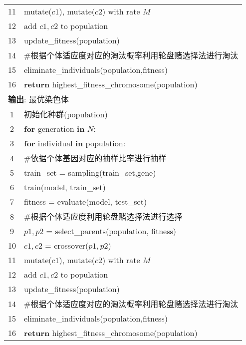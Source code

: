 \begin{table}[h]
\begin{tabularx}{1.0\textwidth}{cl}
		11 & \quad mutate($c1$), mutate($c2$) with rate $M$                                 \\
		12 & \quad add $c1, c2$ to population                                               \\
		13 & \quad update\_fitness(population)                                              \\
		14 & \quad \#根据个体适应度对应的淘汰概率利用轮盘赌选择法进行淘汰                   \\
		15 & \quad eliminate\_individuals(population,fitness)                               \\
		16 & \textbf{return} highest\_fitness\_chromosome(population)                       \\
		\multicolumn{2}{l}{\textbf{输出}: 最优染色体}                                       \\
		1  & 初始化种群(population)                                                         \\
		2  & \textbf{for} generation \textbf{in} $N$:                                       \\
		3  & \quad \textbf{for} individual \textbf{in} population:                          \\
		4  & \quad\quad \#依据个体基因对应的抽样比率进行抽样                                \\
		5  & \quad\quad train\_set = sampling(train\_set,gene)                              \\
		6  & \quad\quad train(model, train\_set)                                            \\
		7  & \quad\quad fitness = evaluate(model, test\_set)                                \\
		8  & \quad \#根据个体适应度利用轮盘赌选择法进行选择                                 \\
		9  & \quad $p1, p2$ = select\_parents(population, fitness)                          \\
		10 & \quad $c1, c2$ = crossover($p1, p2$)                                           \\
		11 & \quad mutate($c1$), mutate($c2$) with rate $M$                                 \\
		12 & \quad add $c1, c2$ to population                                               \\
		13 & \quad update\_fitness(population)                                              \\
		14 & \quad \#根据个体适应度对应的淘汰概率利用轮盘赌选择法进行淘汰                   \\
		15 & \quad eliminate\_individuals(population,fitness)                               \\
		16 & \textbf{return} highest\_fitness\_chromosome(population)                       \\
		\bottomrule
	\end{tabularx}
\end{table}


